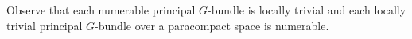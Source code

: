 Observe that each numerable principal $G$-bundle is locally trivial and each locally trivial principal $G$-bundle over a paracompact space is numerable.
